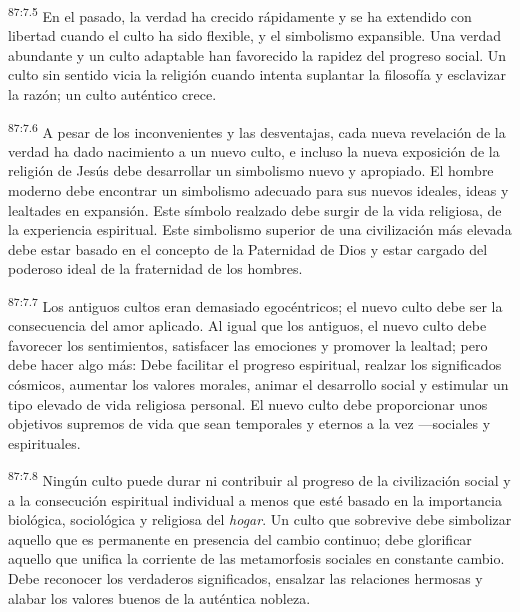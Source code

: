 \documentclass[twoside, 11pt]{book}
\begin{document}
\par
\textsuperscript{87:7.5} En el pasado, la verdad ha crecido rápidamente y se ha extendido con libertad cuando el culto ha sido flexible, y el simbolismo expansible. Una verdad abundante y un culto adaptable han favorecido la rapidez del progreso social. Un culto sin sentido vicia la religión cuando intenta suplantar la filosofía y esclavizar la razón; un culto auténtico crece.

\par
\textsuperscript{87:7.6} A pesar de los inconvenientes y las desventajas, cada nueva revelación de la verdad ha dado nacimiento a un nuevo culto, e incluso la nueva exposición de la religión de Jesús debe desarrollar un simbolismo nuevo y apropiado. El hombre moderno debe encontrar un simbolismo adecuado para sus nuevos ideales, ideas y lealtades en expansión. Este símbolo realzado debe surgir de la vida religiosa, de la experiencia espiritual. Este simbolismo superior de una civilización más elevada debe estar basado en el concepto de la Paternidad de Dios y estar cargado del poderoso ideal de la fraternidad de los hombres.

\par
\textsuperscript{87:7.7} Los antiguos cultos eran demasiado egocéntricos; el nuevo culto debe ser la consecuencia del amor aplicado. Al igual que los antiguos, el nuevo culto debe favorecer los sentimientos, satisfacer las emociones y promover la lealtad; pero debe hacer algo más: Debe facilitar el progreso espiritual, realzar los significados cósmicos, aumentar los valores morales, animar el desarrollo social y estimular un tipo elevado de vida religiosa personal. El nuevo culto debe proporcionar unos objetivos supremos de vida que sean temporales y eternos a la vez ---sociales y espirituales.

\par
\textsuperscript{87:7.8} Ningún culto puede durar ni contribuir al progreso de la civilización social y a la consecución espiritual individual a menos que esté basado en la importancia biológica, sociológica y religiosa del \textit{hogar}. Un culto que sobrevive debe simbolizar aquello que es permanente en presencia del cambio continuo; debe glorificar aquello que unifica la corriente de las metamorfosis sociales en constante cambio. Debe reconocer los verdaderos significados, ensalzar las relaciones hermosas y alabar los valores buenos de la auténtica nobleza.
\end{document}
